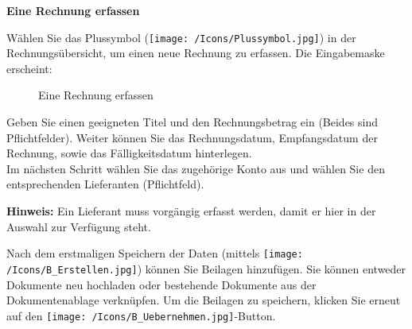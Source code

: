 \vspace{\baselineskip}

\pagebreak
\textbf{Eine Rechnung erfassen}

\vspace{\baselineskip}

Wählen Sie das Plussymbol (\texttt{[image: /Icons/Plussymbol.jpg]}) in der Rechnungsübersicht, um einen neue Rechnung zu erfassen. Die Eingabemaske erscheint:

\begin{figure}[H]
\caption{Eine Rechnung erfassen}
\end{figure}

Geben Sie einen geeigneten Titel und den Rechnungsbetrag ein (Beides sind Pflichtfelder). Weiter können Sie das Rechnungsdatum, Empfangsdatum der Rechnung, sowie das Fälligkeitsdatum hinterlegen. \\
Im nächsten Schritt wählen Sie das zugehörige Konto aus und wählen Sie den entsprechenden Lieferanten (Pflichtfeld).

\vspace{\baselineskip}

\textbf{Hinweis:} Ein Lieferant muss vorgängig erfasst werden, damit er hier in der Auswahl zur Verfügung steht.

\vspace{\baselineskip}

Nach dem erstmaligen Speichern der Daten (mittels \texttt{[image: /Icons/B\_Erstellen.jpg]}) können Sie Beilagen hinzufügen. Sie können entweder Dokumente neu hochladen oder bestehende Dokumente aus der Dokumentenablage verknüpfen. Um die Beilagen zu speichern, klicken Sie erneut auf den \texttt{[image: /Icons/B\_Uebernehmen.jpg]}-Button. 


